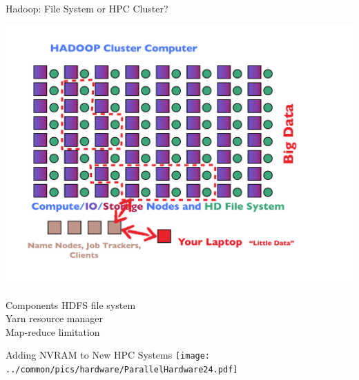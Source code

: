\begin{frame}{Hadoop: File System or HPC Cluster?}
\begin{minipage}{8.5cm}
  \includegraphics[trim=2cm 0cm 0cm 0cm,clip=true,height=0.8\textheight]
  {../common/pics/hardware/ParallelHardware23.pdf}
\end{minipage}
\begin{minipage}{3cm}\small
  \begin{block}{Components}\pause
    \scriptsize HDFS file system\\
    Yarn resource manager \\
    Map-reduce limitation
  \end{block}
\end{minipage}
\end{frame}

\begin{frame}{Adding NVRAM to New HPC Systems}
\texttt{[image: ../common/pics/hardware/ParallelHardware24.pdf]}
\end{frame}



